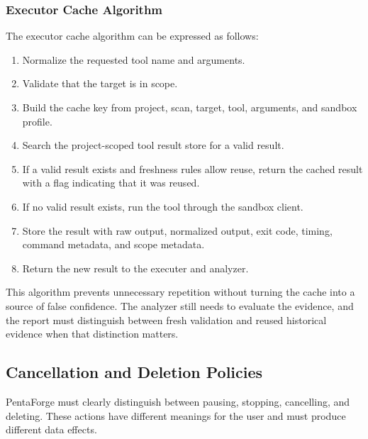 \documentclass[12pt,a4paper]{report}
\begin{document}
\subsubsection{Executor Cache Algorithm}

The executor cache algorithm can be expressed as follows:

\begin{enumerate}
    \item Normalize the requested tool name and arguments.
    \item Validate that the target is in scope.
    \item Build the cache key from project, scan, target, tool, arguments, and sandbox
    profile.
    \item Search the project-scoped tool result store for a valid result.
    \item If a valid result exists and freshness rules allow reuse, return the cached
    result with a flag indicating that it was reused.
    \item If no valid result exists, run the tool through the sandbox client.
    \item Store the result with raw output, normalized output, exit code, timing,
    command metadata, and scope metadata.
    \item Return the new result to the executer and analyzer.
\end{enumerate}

This algorithm prevents unnecessary repetition without turning the cache into a source
of false confidence. The analyzer still needs to evaluate the evidence, and the report
must distinguish between fresh validation and reused historical evidence when that
distinction matters.

\subsection{Cancellation and Deletion Policies}

PentaForge must clearly distinguish between pausing, stopping, cancelling, and deleting.
These actions have different meanings for the user and must produce different data
effects.
\end{document}
